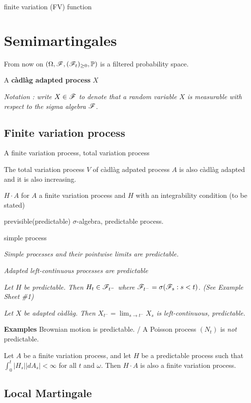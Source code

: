 \documentclass[10pt,a4paper]{article}
\begin{document}
 finite variation (FV) function

\section{Semimartingales}

From now on $(\Omega, \mathscr{F}, (\mathscr{F}_t)_{\geq 0}, \mathbb{P})$ is a filtered probability space.
\s

 A \textbf{c\`adl\`ag adapted process} $X$

\textit{Notation : write $X\in \mathscr{F}$ to denote that a random variable $X$ is measurable with respect to the sigma algebra $\mathscr{F}$}.

\subsection{Finite variation process}

 A finite variation process, total variation process
\s

\fact The total variation process $V$ of c\`adl\`ag adpated process $A$ is also c\`adl\`ag adapted and it is also increasing.
\s

 $H \cdot A$ for $A$ a finite variation process and $H$ with an integrability condition (to be stated)
\s

 previsible(predictable) $\sigma$-algebra, predictable process.
\s

 simple process
\s

\fact \emph{Simple processes and their pointwise limits are predictable.}
\s

\fact \emph{Adapted left-continuous processes are predictable}
\s

\fact \emph{Let $H$ be predictable. Then $H_t \in \mathscr{F}_{t^-}$ where $\mathscr{F}_{t^{-}} = \sigma(\mathscr{F}_s : s< t)$. (See Example Sheet \#1)}
\s

\fact \emph{Let $X$ be adapted c\`adl\`ag. Then $X_{t^-} = \lim_{s\rightarrow t^-} X_s$ is left-continuous, predictable.}
\s

\textbf{Examples} Brownian motion is predictable. / A Poisson process $(N_t)$ is \emph{not} predictable.
\s

\prop Let $A$ be a finite variation process, and let $H$ be a predictable process such that $\int_0^t |H_s| |dA_s| < \infty$ for all $t$ and $\omega$. Then $H\cdot A$ is also a finite variation process.

\subsection{Local Martingale}
\end{document}
